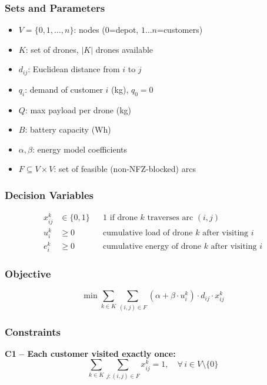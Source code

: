 \documentclass[12pt,a4paper]{article}
\begin{document}
\subsubsection{Sets and Parameters}
\begin{itemize}[nosep]
  \item $V=\{0,1,\dots,n\}$: nodes ($0$=depot, $1\dots n$=customers)
  \item $K$: set of drones, $|K|$ drones available
  \item $d_{ij}$: Euclidean distance from $i$ to $j$
  \item $q_i$: demand of customer $i$ (kg), $q_0=0$
  \item $Q$: max payload per drone (kg)
  \item $B$: battery capacity (Wh)
  \item $\alpha,\beta$: energy model coefficients
  \item $F \subseteq V\times V$: set of feasible (non-NFZ-blocked) arcs
\end{itemize}

\subsubsection{Decision Variables}
\begin{align}
x_{ij}^k &\in \{0,1\} && \text{1 if drone $k$ traverses arc $(i,j)$} \\
u_i^k &\geq 0 && \text{cumulative load of drone $k$ after visiting $i$} \\
e_i^k &\geq 0 && \text{cumulative energy of drone $k$ after visiting $i$}
\end{align}

\subsubsection{Objective}
\begin{equation}
\min \sum_{k\in K}\sum_{(i,j)\in F} (\alpha + \beta \cdot u_i^k)\cdot d_{ij}\cdot x_{ij}^k
\end{equation}

\subsubsection{Constraints}
\textbf{C1 -- Each customer visited exactly once:}
\begin{equation}
\sum_{k\in K}\sum_{j:(i,j)\in F} x_{ij}^k = 1, \quad \forall\, i \in V\setminus\{0\}
\end{equation}
\end{document}
